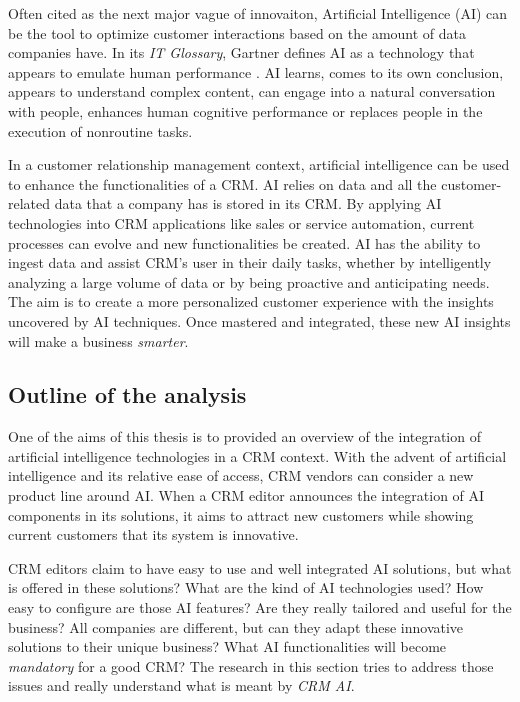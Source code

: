 Often cited as the next major vague of innovaiton, Artificial Intelligence (AI) can be the tool to optimize customer interactions based on the amount of data companies have. In its \textit{IT Glossary}, Gartner defines AI as a technology that appears to emulate human performance \cite{gartner-glossary}. AI learns, comes to its own conclusion, appears to understand complex content, can engage into a natural conversation with people, enhances human cognitive performance or replaces people in the execution of nonroutine tasks.

In a customer relationship management context, artificial intelligence can be used to enhance the functionalities of a CRM. AI relies on data and all the customer-related data that a company has is stored in its CRM. By applying AI technologies into CRM applications like sales or service automation, current processes can evolve and new functionalities be created. AI has the ability to ingest data and assist CRM's user in their daily tasks, whether by intelligently analyzing a large volume of data or by being proactive and anticipating needs. The aim is to create a more personalized customer experience with the insights uncovered by AI techniques. Once mastered and integrated, these new AI insights will make a business \textit{smarter}.


\subsection{Outline of the analysis}
One of the aims of this thesis is to provided an overview of the integration of artificial intelligence technologies in a CRM context. With the advent of artificial intelligence and its relative ease of access, CRM vendors can consider a new product line around AI. When a CRM editor announces the integration of AI components in its solutions, it aims to attract new customers while showing current customers that its system is innovative.

CRM editors claim to have easy to use and well integrated AI solutions, but what is offered in these solutions? What are the kind of AI technologies used? How easy to configure are those AI features? Are they really tailored and useful for the business? All companies are different, but can they adapt these innovative solutions to their unique business? What AI functionalities will become \textit{mandatory} for a good CRM? The research in this section tries to address those issues and really understand what is meant by \textit{CRM AI}.


